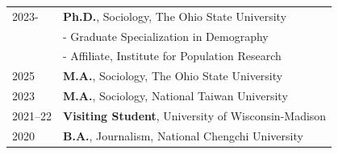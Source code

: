 

\renewcommand{\thefootnote}{\fnsymbol{footnote}}
\setcounter{footnote}{0}

\begin{longtable}[l]{@{}p{} p{}}
    2023- & \textbf{Ph.D.}, Sociology, The Ohio State University  \\
          & \hspace{2em}- Graduate Specialization in Demography \\
          & \hspace{2em}- Affiliate, Institute for Population Research \\

    2025 & \textbf{M.A.}, Sociology, The Ohio State University \\
    2023 & \textbf{M.A.}, Sociology, National Taiwan University \\

    2021--22 & \textbf{Visiting Student}, University of Wisconsin-Madison \\

    2020 & \textbf{B.A.}, Journalism, National Chengchi University
\end{longtable}




\renewcommand{\thefootnote}{\arabic{footnote}}
\setcounter{footnote}{1}
